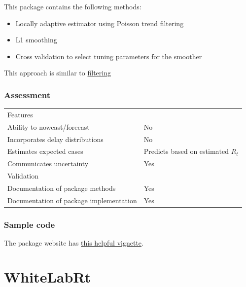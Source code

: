 \documentclass[
  letterpaper,
  DIV=11,
  numbers=noendperiod]{scrreprt}
\providecommand{\tightlist}{%
  \setlength{\itemsep}{0pt}\setlength{\parskip}{0pt}}\usepackage{longtable,booktabs,array}
\begin{document}
This package contains the following methods:

\begin{itemize}
\tightlist
\item
  Locally adaptive estimator using Poisson trend filtering
\item
  L1 smoothing
\item
  Cross validation to select tuning parameters for the smoother
\end{itemize}

This approach is similar to \hyperref[sec-filtering]{filtering}

\subsection*{Assessment}\label{assessment-13}

\begin{longtable}[]{@{}
  >{\raggedright\arraybackslash}p{}
  >{\raggedright\arraybackslash}p{}@{}}
\toprule\noalign{}
\endhead
\bottomrule\noalign{}
\endlastfoot
Features & \\
Ability to nowcast/forecast & No \\
Incorporates delay distributions & No \\
Estimates expected cases & Predicts based on estimated \(R_t\) \\
Communicates uncertainty & Yes \\
Validation & \\
Documentation of package methods & Yes \\
Documentation of package implementation & Yes \\
\end{longtable}

\subsection*{Sample code}\label{sample-code-11}

The package website has
\href{https://dajmcdon.github.io/rtestim/articles/rtestim.html}{this
helpful vignette}.

\chapter*{WhiteLabRt}\label{whitelabrt}
\end{document}
